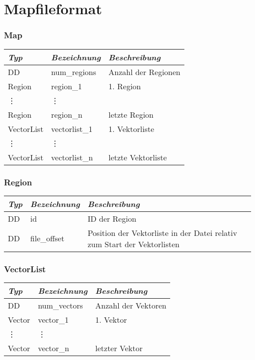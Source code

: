 \section{Mapfileformat}

\subsubsection{Map}

\begin{tabular}{|l|l|l|}
\hline
\emph{Typ} & \emph{Bezeichnung} & \emph{Beschreibung} \\
\hline
DD & num\_regions & Anzahl der Regionen \\
\hline
Region & region\_1 & 1. Region \\
\vdots & \vdots & \\
Region & region\_n & letzte Region \\
\hline
VectorList& vectorlist\_1 & 1. Vektorliste \\
\vdots & \vdots & \\
VectorList& vectorlist\_n & letzte Vektorliste \\
\hline
\end{tabular}

\subsubsection{Region}
\begin{tabular}{|l|l|l|}
\hline
\emph{Typ} & \emph{Bezeichnung} & \emph{Beschreibung} \\
\hline
DD & id & ID der Region \\
\hline
DD & file\_offset & Position der Vektorliste in der Datei relativ zum
Start der Vektorlisten\\
\hline
\end{tabular}

\subsubsection{VectorList}
\begin{tabular}{|l|l|l|}
\hline
\emph{Typ} & \emph{Bezeichnung} & \emph{Beschreibung} \\
\hline
DD & num\_vectors & Anzahl der Vektoren \\
\hline
Vector& vector\_1 & 1. Vektor \\
\vdots & \vdots & \\
Vector& vector\_n & letzter Vektor \\
\hline
\end{tabular}

